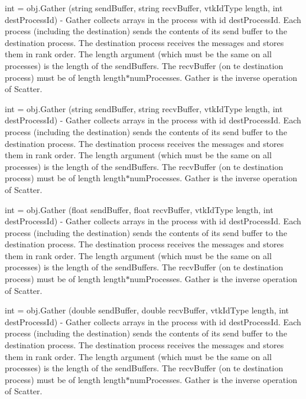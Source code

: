 \begin{DoxyItemize}
\item {\ttfamily int = obj.\-Gather (string send\-Buffer, string recv\-Buffer, vtk\-Id\-Type length, int dest\-Process\-Id)} -\/ Gather collects arrays in the process with id {\ttfamily dest\-Process\-Id}. Each process (including the destination) sends the contents of its send buffer to the destination process. The destination process receives the messages and stores them in rank order. The {\ttfamily length} argument (which must be the same on all processes) is the length of the send\-Buffers. The {\ttfamily recv\-Buffer} (on te destination process) must be of length length$\ast$num\-Processes. Gather is the inverse operation of Scatter.  
\item {\ttfamily int = obj.\-Gather (string send\-Buffer, string recv\-Buffer, vtk\-Id\-Type length, int dest\-Process\-Id)} -\/ Gather collects arrays in the process with id {\ttfamily dest\-Process\-Id}. Each process (including the destination) sends the contents of its send buffer to the destination process. The destination process receives the messages and stores them in rank order. The {\ttfamily length} argument (which must be the same on all processes) is the length of the send\-Buffers. The {\ttfamily recv\-Buffer} (on te destination process) must be of length length$\ast$num\-Processes. Gather is the inverse operation of Scatter.  
\item {\ttfamily int = obj.\-Gather (float send\-Buffer, float recv\-Buffer, vtk\-Id\-Type length, int dest\-Process\-Id)} -\/ Gather collects arrays in the process with id {\ttfamily dest\-Process\-Id}. Each process (including the destination) sends the contents of its send buffer to the destination process. The destination process receives the messages and stores them in rank order. The {\ttfamily length} argument (which must be the same on all processes) is the length of the send\-Buffers. The {\ttfamily recv\-Buffer} (on te destination process) must be of length length$\ast$num\-Processes. Gather is the inverse operation of Scatter.  
\item {\ttfamily int = obj.\-Gather (double send\-Buffer, double recv\-Buffer, vtk\-Id\-Type length, int dest\-Process\-Id)} -\/ Gather collects arrays in the process with id {\ttfamily dest\-Process\-Id}. Each process (including the destination) sends the contents of its send buffer to the destination process. The destination process receives the messages and stores them in rank order. The {\ttfamily length} argument (which must be the same on all processes) is the length of the send\-Buffers. The {\ttfamily recv\-Buffer} (on te destination process) must be of length length$\ast$num\-Processes. Gather is the inverse operation of Scatter.  

\end{DoxyItemize}
